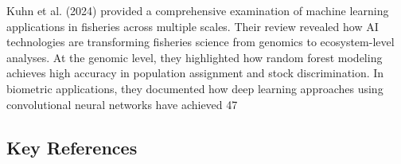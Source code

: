 Kuhn et al. (2024) provided a comprehensive examination of machine learning applications in fisheries across multiple scales. Their review revealed how AI technologies are transforming fisheries science from genomics to ecosystem-level analyses. At the genomic level, they highlighted how random forest modeling achieves high accuracy in population assignment and stock discrimination. In biometric applications, they documented how deep learning approaches using convolutional neural networks have achieved 47%

\subsection*{Key References}

